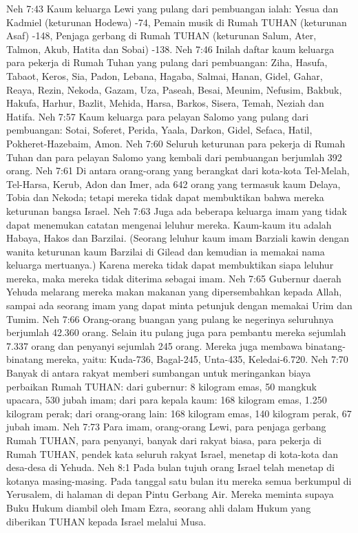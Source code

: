 Neh 7:43  Kaum keluarga Lewi yang pulang dari pembuangan ialah: Yesua dan Kadmiel (keturunan Hodewa) -74, Pemain musik di Rumah TUHAN (keturunan Asaf) -148, Penjaga gerbang di Rumah TUHAN (keturunan Salum, Ater, Talmon, Akub, Hatita dan Sobai) -138.
Neh 7:46  Inilah daftar kaum keluarga para pekerja di Rumah Tuhan yang pulang dari pembuangan: Ziha, Hasufa, Tabaot, Keros, Sia, Padon, Lebana, Hagaba, Salmai, Hanan, Gidel, Gahar, Reaya, Rezin, Nekoda, Gazam, Uza, Paseah, Besai, Meunim, Nefusim, Bakbuk, Hakufa, Harhur, Bazlit, Mehida, Harsa, Barkos, Sisera, Temah, Neziah dan Hatifa.
Neh 7:57  Kaum keluarga para pelayan Salomo yang pulang dari pembuangan: Sotai, Soferet, Perida, Yaala, Darkon, Gidel, Sefaca, Hatil, Pokheret-Hazebaim, Amon.
Neh 7:60  Seluruh keturunan para pekerja di Rumah Tuhan dan para pelayan Salomo yang kembali dari pembuangan berjumlah 392 orang.
Neh 7:61  Di antara orang-orang yang berangkat dari kota-kota Tel-Melah, Tel-Harsa, Kerub, Adon dan Imer, ada 642 orang yang termasuk kaum Delaya, Tobia dan Nekoda; tetapi mereka tidak dapat membuktikan bahwa mereka keturunan bangsa Israel.
Neh 7:63  Juga ada beberapa keluarga imam yang tidak dapat menemukan catatan mengenai leluhur mereka. Kaum-kaum itu adalah Habaya, Hakos dan Barzilai. (Seorang leluhur kaum imam Barziali kawin dengan wanita keturunan kaum Barzilai di Gilead dan kemudian ia memakai nama keluarga mertuanya.) Karena mereka tidak dapat membuktikan siapa leluhur mereka, maka mereka tidak diterima sebagai imam.
Neh 7:65  Gubernur daerah Yehuda melarang mereka makan makanan yang dipersembahkan kepada Allah, sampai ada seorang imam yang dapat minta petunjuk dengan memakai Urim dan Tumim.
Neh 7:66  Orang-orang buangan yang pulang ke negerinya seluruhnya berjumlah 42.360 orang. Selain itu pulang juga para pembantu mereka sejumlah 7.337 orang dan penyanyi sejumlah 245 orang. Mereka juga membawa binatang-binatang mereka, yaitu: Kuda-736, Bagal-245, Unta-435, Keledai-6.720.
Neh 7:70  Banyak di antara rakyat memberi sumbangan untuk meringankan biaya perbaikan Rumah TUHAN: dari gubernur: 8 kilogram emas, 50 mangkuk upacara, 530 jubah imam; dari para kepala kaum: 168 kilogram emas, 1.250 kilogram perak; dari orang-orang lain: 168 kilogram emas, 140 kilogram perak, 67 jubah imam.
Neh 7:73  Para imam, orang-orang Lewi, para penjaga gerbang Rumah TUHAN, para penyanyi, banyak dari rakyat biasa, para pekerja di Rumah TUHAN, pendek kata seluruh rakyat Israel, menetap di kota-kota dan desa-desa di Yehuda.
Neh 8:1  Pada bulan tujuh orang Israel telah menetap di kotanya masing-masing. Pada tanggal satu bulan itu mereka semua berkumpul di Yerusalem, di halaman di depan Pintu Gerbang Air. Mereka meminta supaya Buku Hukum diambil oleh Imam Ezra, seorang ahli dalam Hukum yang diberikan TUHAN kepada Israel melalui Musa.
